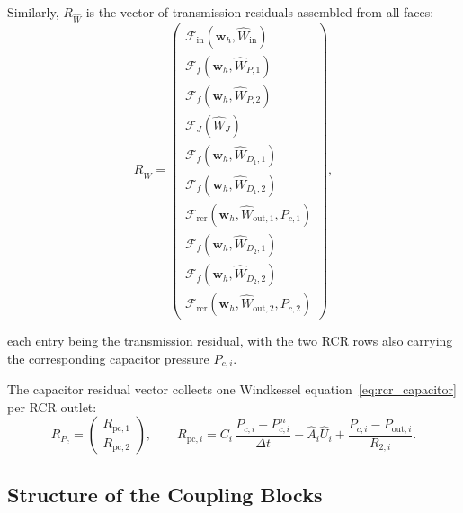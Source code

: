 \documentclass[11pt]{article}
\begin{document}
Similarly, $R_{\widehat{W}}$ is the vector of transmission
residuals assembled from all faces:
\begin{equation}
R_{\widehat{W}}
=
\begin{pmatrix}
\mathcal{F}_{\mathrm{in}}(\mathbf{w}_h, \widehat{W}_{\mathrm{in}})              \\
\mathcal{F}_{f}(\mathbf{w}_h, \widehat{W}_{P,1})                                \\
\mathcal{F}_{f}(\mathbf{w}_h, \widehat{W}_{P,2})                                \\
\mathcal{F}_{J}(\widehat{W}_{J})                                                 \\
\mathcal{F}_{f}(\mathbf{w}_h, \widehat{W}_{D_1,1})                              \\
\mathcal{F}_{f}(\mathbf{w}_h, \widehat{W}_{D_1,2})                              \\
\mathcal{F}_{\mathrm{rcr}}(\mathbf{w}_h, \widehat{W}_{\mathrm{out},1}, P_{c,1}) \\
\mathcal{F}_{f}(\mathbf{w}_h, \widehat{W}_{D_2,1})                              \\
\mathcal{F}_{f}(\mathbf{w}_h, \widehat{W}_{D_2,2})                              \\
\mathcal{F}_{\mathrm{rcr}}(\mathbf{w}_h, \widehat{W}_{\mathrm{out},2}, P_{c,2})
\end{pmatrix},
\label{eq:R_What}
\end{equation}

each entry being the transmission residual, with the two RCR rows also
carrying the corresponding capacitor pressure $P_{c,i}$.

The capacitor residual vector collects one Windkessel
equation~\eqref{eq:rcr_capacitor} per RCR outlet:
\begin{equation}
R_{P_c}
=
\begin{pmatrix}
R_{\mathrm{pc},1}\\
R_{\mathrm{pc},2}
\end{pmatrix},
\qquad
R_{\mathrm{pc},i}
=
C_i\,\frac{P_{c,i}-P_{c,i}^{\,n}}{\Delta t}
-\widehat{A}_i\widehat{U}_i
+\frac{P_{c,i}-P_{\mathrm{out},i}}{R_{2,i}} .
\label{eq:R_Pc}
\end{equation}

\subsection{Structure of the Coupling Blocks}
\end{document}
